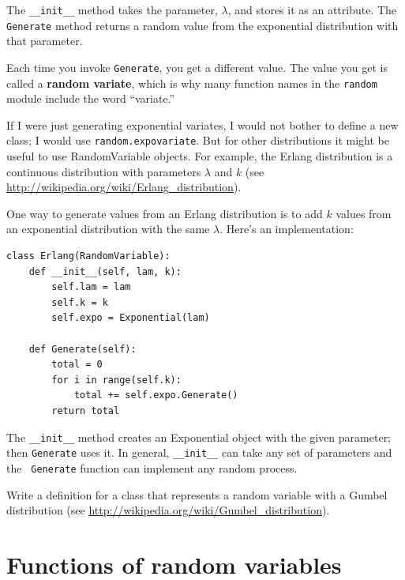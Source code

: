 \documentclass[12pt]{book}
\begin{document}
The \verb"__init__" method takes the parameter, $\lambda$, and stores it as
an attribute.  The {\tt Generate} method returns a random value
from the exponential distribution with that parameter.

Each time you invoke {\tt Generate}, you get a different value.  The
value you get is called a {\bf random variate}, which is why many
function names in the {\tt random} module include the word ``variate.''

If I were just generating exponential variates, I would not bother to
define a new class; I would use {\tt random.expovariate}.  But for
other distributions it might be useful to use RandomVariable objects.
For example, the Erlang distribution is a continuous distribution with
parameters $\lambda$ and $k$ (see
\url{http://wikipedia.org/wiki/Erlang_distribution}).

One way to generate values from an Erlang distribution is to add
$k$ values from an exponential distribution with the same $\lambda$.
Here's an implementation:
%
\begin{verbatim}
class Erlang(RandomVariable):
    def __init__(self, lam, k):
        self.lam = lam
        self.k = k
        self.expo = Exponential(lam)

    def Generate(self):
        total = 0
        for i in range(self.k):
            total += self.expo.Generate()
        return total
\end{verbatim}

The \verb"__init__" method creates an Exponential object with the
given parameter; then {\tt Generate} uses it.  In general,
\verb"__init__" can take any set of parameters and the {\tt
  Generate} function can implement any random process.

\begin{exercise}
Write a definition for a class that represents a random variable
with a Gumbel distribution (see \url{http://wikipedia.org/wiki/Gumbel_distribution}).

\end{exercise}


\section{Functions of random variables}
\end{document}
